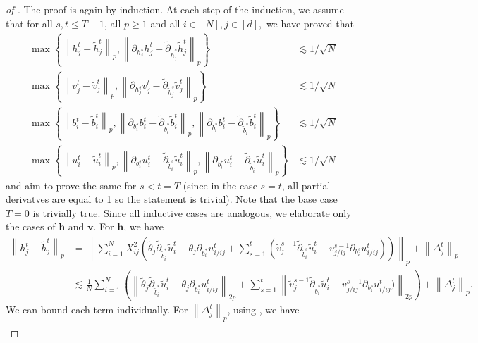 \documentclass{article}
\newcommand{\1}{\mathbbm{1}}
\newcommand{\norm}[1]{\left\lVert#1\right\rVert}
\theoremstyle{plain}
\theoremstyle{definition}
\theoremstyle{remark}
\newcommand{\bfv}{\boldsymbol{v}}
\newcommand{\bfh}{\boldsymbol{h}}
\begin{document}
\begin{proof}[of ]
      The proof is again by induction. At each step of the induction, we assume that for all $s,t\leq T-1$, all $p\geq 1$ and all $i\in [N],j\in [d],$ we have proved that
    \begin{align*}
        \max\left\{\norm{ h_j^t - \tilde{ h}_j^t}_p , \norm{\partial_{ h_j^s} h_j^t - \tilde{\partial}_{\tilde{ h}_j^s}\tilde{ h}_j^t}_p\right\}&\lesssim 1/\sqrt{N} \\
        \max\left\{\norm{ v_j^t - \tilde{ v}_j^t}_p , \norm{\partial_{ h_j^s} v_j^t - \tilde{\partial}_{\tilde{ h}_j^s}\tilde{ v}_j^t}_p\right\}&\lesssim 1/\sqrt{N} \\
        \max\left\{\norm{ b_i^t - \tilde{ b}_i^t}_p , \norm{\partial_{ b_i^s} b_i^t - \tilde{\partial}_{\tilde{ b}_i^s}\tilde{ b}_i^t}_p,\norm{\partial_{ b^*_i} b_i^t - \tilde{\partial}_{\tilde{ b}^*_i}\tilde{ b}_i^t}_p \right\}&\lesssim 1/\sqrt{N} \\
        \max\left\{\norm{ u_i^t - \tilde{ u}_i^t}_p , \norm{\partial_{ b_i^s} u_i^t - \tilde{\partial}_{\tilde{ b}_i^s}\tilde{ u}_i^t}_p,\norm{\partial_{ b_i^*} u_i^t - \tilde{\partial}_{\tilde{ b}^*_i}\tilde{ u}_i^t}_p \right\}&\lesssim 1/\sqrt{N}
    \end{align*}
    and aim to prove the same for $s<t=T$ (since in the case $s=t$, all partial derivatves are equal to 1 so the statement is trivial). Note that the base case $T=0$ is trivially true. Since all inductive cases are analogous, we elaborate only the cases of $\bfh$ and $\bfv.$ For $\bfh$, we have
    \begin{align*}
        \norm{h_j^t - \tilde{h}_j^t}_p &= \norm{\sum_{i=1}^N X_{ij}^2 \left(\tilde{\theta}_j \tilde{\partial}_{\tilde{b}_i^*} \tilde{u}_i^t - \theta_j \partial_{b_i^*}u_{i/ij}^t + \sum_{s=1}^t (\tilde{v}_j^{s-1} \tilde{\partial}_{\tilde{b}_i^s} \tilde{u}_i^t - v_{j/ij}^{s-1} \partial_{b_i^s}u_{i/ij}^t )\right)}_p + \norm{\Delta_j^t}_p \\
        &\lesssim  \frac{1}{N}\sum_{i=1}^N\left(\norm{ \tilde{\theta}_j \tilde{\partial}_{\tilde{b}_i^*} \tilde{u}_i^t - \theta_j \partial_{b_i^*}u_{i/ij}^t }_{2p}+ \sum_{s=1}^t \norm{\tilde{v}_j^{s-1} \tilde{\partial}_{\tilde{b}_i^s} \tilde{u}_i^t - v_{j/ij}^{s-1} \partial_{b_i^s}u_{i/ij}^t )}_{2p}\right) + \norm{\Delta_j^t}_p.
    \end{align*}
    We can bound each term individually. For $\norm{\Delta_j^t}_p$, using , we have 
    \begin{align*}

\end{align*}
\end{proof}
\end{document}
